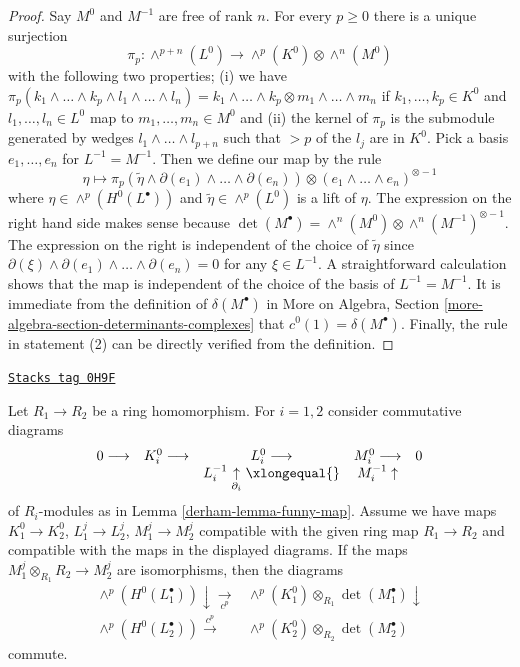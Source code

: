 \begin{proof}
Say $M^0$ and $M^{-1}$ are free of rank $n$. For every $p \geq 0$
there is a unique surjection
$$
\pi_p :
\wedge^{p + n}(L^0)
\longrightarrow
\wedge^p(K^0) \otimes \wedge^n(M^0)
$$
with the following two properties; (i) we have
$
\pi_p(k_1 \wedge \ldots \wedge k_p \wedge l_1 \wedge \ldots \wedge l_n) =
k_1 \wedge \ldots \wedge k_p \otimes
m_1 \wedge \ldots \wedge m_n
$
if $k_1, \ldots, k_p \in K^0$ and $l_1, \ldots, l_n \in L^0$ map
to $m_1, \ldots, m_n \in M^0$ and (ii) the kernel of $\pi_p$ is the
submodule generated by wedges
$l_1 \wedge \ldots \wedge l_{p + n}$ such that $> p$ of the
$l_j$ are in $K^0$. Pick a basis $e_1, \ldots, e_n$ for $L^{-1} = M^{-1}$.
Then we define our map by the rule
$$
\eta \mapsto
\pi_p(\tilde \eta \wedge \partial(e_1) \wedge \ldots \wedge \partial(e_n))
\otimes (e_1 \wedge \ldots \wedge e_n)^{\otimes -1}
$$
where $\eta \in \wedge^p(H^0(L^\bullet))$ and $\tilde \eta \in \wedge^p(L^0)$
is a lift of $\eta$. The expression on the right hand side makes sense because
$\det(M^\bullet) = \wedge^n(M^0) \otimes \wedge^n(M^{-1})^{\otimes -1}$.
The expression on the right is independent of the choice of $\tilde \eta$ since
$\partial(\xi) \wedge \partial(e_1) \wedge \ldots \wedge \partial(e_n) = 0$
for any $\xi \in L^{-1}$. A straightforward calculation shows that the map
is independent of the choice of the basis of $L^{-1} = M^{-1}$.
It is immediate from the definition of $\delta(M^\bullet)$ in
More on Algebra, Section \ref{more-algebra-section-determinants-complexes}
that $c^0(1) = \delta(M^\bullet)$. Finally, the rule in statement (2)
can be directly verified from the definition.
\end{proof}

\begin{lemma}
\label{derham-lemma-funny-map-functorial}
\href{https://stacks.math.columbia.edu/tag/0H9F}{\texttt{Stacks tag 0H9F}}

Let $R_1 \to R_2$ be a ring homomorphism. For $i = 1, 2$ consider
commutative diagrams
$$
\begin{array}{ccccc}0 \longrightarrow & K_i^0 \longrightarrow & L_i^0 \longrightarrow & M_i^0 \longrightarrow & 0 \\  &  & L_i^{-1} \underset{\partial_i}{\uparrow}\xlongequal{} & M_i^{-1} \uparrow & \end{array}
$$
of $R_i$-modules as in Lemma \ref{derham-lemma-funny-map}. Assume we have
maps $K_1^0 \to K_2^0$, $L_1^j \to L_2^j$, $M_1^j \to M_2^j$
compatible with the given ring map $R_1 \to R_2$ and
compatible with the maps in the displayed diagrams. If the maps
$M_1^j \otimes_{R_1} R_2 \to M_2^j$ are isomorphisms, then
the diagrams
$$
\begin{array}{cc}\wedge^p(H^0(L_1^\bullet)) \downarrow\underset{c^p}{\longrightarrow} & \wedge^p(K_1^0) \otimes_{R_1} \det(M_1^\bullet) \downarrow \\ \wedge^p(H^0(L_2^\bullet))
\overset{c^p}{\longrightarrow} & \wedge^p(K_2^0) \otimes_{R_2} \det(M_2^\bullet)\end{array}
$$
commute.
\end{lemma}


